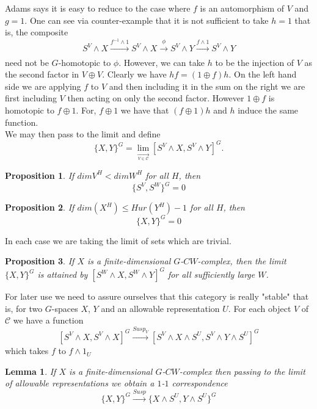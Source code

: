 \documentclass{article}
\theoremstyle{problemstyle}
\theoremstyle{problemstyle}
\theoremstyle{problemstyle}
\theoremstyle{problemstyle}
\newtheorem{lemma}{Lemma}
\theoremstyle{problemstyle}
\newtheorem{proposition}{Proposition}
\theoremstyle{problemstyle}
\begin{document}
Adams says it is easy to reduce to the case where $f$ is an automorphism of $V$ and $g = 1$. One can see via counter-example that it is not sufficient to take $h=1$ that is, the composite $$S^V\wedge X \xrightarrow[]{f^{-1}\wedge 1} S^V\wedge X \xrightarrow[]{\phi} S^V\wedge Y \xrightarrow[]{f \wedge 1} S^V\wedge Y$$ need not be $G$-homotopic to $\phi$. However, we can take $h$ to be the injection of $V$ as the second factor in $V\oplus V$. Clearly we have $hf = (1\oplus f)h$. On the left hand side we are applying $f$ to $V$ and then including it in the sum on the right we are first including $V$ then acting on only the second factor. However $1\oplus f$ is homotopic to $f \oplus 1$. For, $f \oplus 1$ we have that $(f \oplus 1)h$ and $h$ induce the same function.\\ 

We may then pass to the limit and define $$\{X,Y\}^G = \lim_{\xrightarrow[V \in \mathcal{C}]{}}[S^V \wedge X, S^V \wedge Y]^G.$$

\begin{proposition}
If $dim V^H < dim W^H$ for all $H$, then $$\{S^V,S^W\}^G = 0$$ 
\end{proposition}

\begin{proposition}
If $dim(X^H) \leq Hur (Y^H) - 1$ for all $H$, then $$\{X,Y\}^G = 0$$
\end{proposition}

In each case we are taking the limit of sets which are trivial. 

\begin{proposition}
If $X$ is a finite-dimensional $G$-$CW$-complex, then the limit $\{X,Y\}^G$ is attained by $[S^W \wedge X, S^W \wedge Y]^G$ for all sufficiently large $W$. 
\end{proposition}

For later use we need to assure ourselves that this category is really "stable" that is, for two $G$-spaces $X$, $Y$ and an allowable representation $U$. For each object $V$ of $\mathcal{C}$ we have a function  $$[S^V\wedge X,S^V\wedge X]^G \xrightarrow[]{Susp_V} [S^V \wedge X \wedge S^U, S^V \wedge Y \wedge S^U]^G$$ which takes $f$ to $f \wedge 1_U$ 

\begin{lemma}
If $X$ is a finite-dimensional $G$-$CW$-complex then passing to the limit of allowable representations we obtain a $1$-$1$ correspondence $$\{X,Y\}^G \xrightarrow[]{Susp} \{X \wedge S^U, Y \wedge S^U\}^G$$
\end{lemma}
\end{document}
